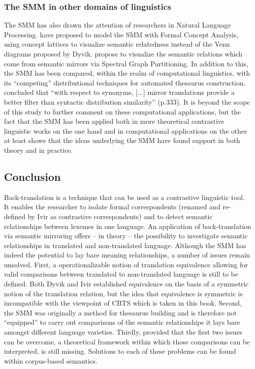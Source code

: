 \subsubsection{The SMM in other domains of linguistics}
\label{sec:2.3.4.5}  
The SMM has also drawn the attention of researchers in Natural Language Processing. \citet{ganter_conceptual_2005} have proposed to model the SMM with Formal Concept Analysis, using concept lattices to visualize semantic relatedness instead of the Venn diagrams proposed by Dyvik. \citet{elden_computing_2013} propose to visualize the semantic relations which come from semantic mirrors via Spectral Graph Partitioning. In addition to this, the SMM has been compared, within the realm of computational linguistics, with its ``competing'' distributional techniques for automated thesaurus construction. \citet{butz_comparing_2011} concluded that “with respect to synonyms, [...] mirror translations provide a better filter than syntactic distribution similarity” (p.333). It is beyond the scope of this study to further comment on these computational applications, but the fact that the SMM has been applied both in more theoretical contrastive linguistic works on the one hand and in computational applications on the other at least shows that the ideas underlying the SMM have found support in both theory and in practice.

\subsection{Conclusion}
\label{sec:2.3.5}  
Back-translation is a technique that can be used as a contrastive linguistic tool. It enables the researcher to isolate formal correspondents (renamed and re-defined by Ivir as contrastive correspondents) and to detect semantic relationships between lexemes in one language. An application of back-translation via semantic mirroring offers – in theory – the possibility to investigate semantic relationships in translated and non-translated language. Although the SMM has indeed the potential to lay bare meaning relationships, a number of issues remain unsolved. First, a operationalizable notion of translation equivalence allowing for valid comparisons between translated to non-translated language is still to be defined. Both Dyvik and Ivir established equivalence on the basis of a symmetric notion of the translation relation, but the idea that equivalence is symmetric is incompatible with the viewpoint of CBTS which is taken in this book. Second, the SMM was originally a method for thesaurus building and is therefore not ``equipped'' to carry out comparisons of the semantic relationships it lays bare amongst different language varieties. Thirdly, provided that the first two issues can be overcome, a theoretical framework within which those comparisons can be interpreted, is still missing. Solutions to each of these problems can be found within corpus-based semantics.

